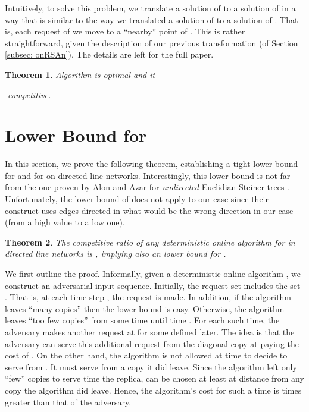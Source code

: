 \documentclass[11pt]{article}
\newtheorem{theorem}{Theorem}[section]
\def\proof{\par\noindent{\bf Proof:~}}
\begin{document}
Intuitively, to solve this problem, we translate a solution of  to a solution of  in a way that is similar to the way we translated a solution of  to a solution of . That is,  each request of  we move to a ``nearby'' point of . This is rather straightforward, given the description of our previous transformation (of Section \ref{subsec: onRSAn}).
The details are left for the full paper.




\begin{theorem}
Algorithm  is optimal and it
\begin{center}
-competitive.
\end{center}
\end{theorem}














\vspace{-0.2cm}
\section{Lower Bound for }


\label{sec:Lower bound}



In this section, we prove the following theorem, establishing a tight lower bound for  and for  on directed line networks.
Interestingly,  this lower bound is not far from the one proven by Alon and Azar  for {\em undirected} Euclidian Steiner trees \cite{AlonAzar93}.
Unfortunately,  the lower bound of \cite{AlonAzar93} does not apply to our case since their construct uses edges directed in what would be the wrong direction in our case (from a high  value to a low one).

\begin{theorem}
The competitive ratio of any deterministic online algorithm for
 in directed line networks is ,
implying also an
 lower bound for .
\label{thm: lower bound for RSA and MCD on directed}
\end{theorem}
\proof
We first outline the proof.
Informally, given a deterministic online algorithm , we construct an adversarial input sequence.
Initially, the request set includes the set .
That is, at each time step , the request  is made.
In addition, if the algorithm leaves ``many copies'' then the lower bound is easy.
Otherwise, the algorithm leaves ``too few copies'' from some time  until time .
For each such time, the adversary makes another request at  for some  defined later.
The idea is that the adversary can serve this additional request from the diagonal copy at  paying the cost of .
On the other hand,
the algorithm is not allowed at time  to decide to serve from .
It must serve from a copy it did leave.
Since the algorithm left only ``few'' copies to serve time  the replica,  can be chosen at least at distance  from any copy the algorithm did leave.
Hence, the algorithm's cost for such a time  is  times greater than that of the adversary.
\end{document}
